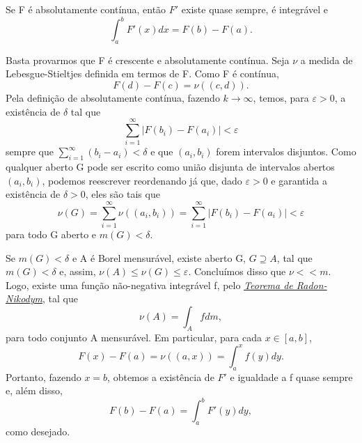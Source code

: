 \documentclass[measure_theory.tex]{subfiles}
\begin{document}
\begin{theorem*}
	Se F é absolutamente contínua, então \(F'\) existe quase sempre, é integrável e
	\[
		\int_{a}^{b}F'(x)dx = F(b) - F(a).
	\]
\end{theorem*}
\begin{proof*}
	Basta provarmos que F é crescente e absolutamente contínua. Seja \(\nu \) a medida de Lebesgue-Stieltjes definida em termos de F. Como F é contínua,
	\[
		F(d) - F(c) = \nu ((c, d)).
	\]
	Pela definição de absolutamente contínua, fazendo \(k\to \infty\), temos, para \(\varepsilon > 0\), a existência de \(\delta \) tal que
	\[
		\sum\limits_{i=1}^{\infty}|F(b_{i}) - F(a_{i})| < \varepsilon
	\]
	sempre que \(\sum\limits_{i=1}^{\infty}(b_{i}-a_{i})<\delta \) e que \((a_{i}, b_{i})\) forem intervalos disjuntos. Como qualquer aberto G pode ser escrito como união disjunta de intervalos abertos \((a_{i}, b_{i})\), podemos reescrever reordenando já que,
	dado \(\varepsilon > 0\) e garantida a existência de \(\delta > 0\), eles são tais que
	\[
		\nu (G) = \sum\limits_{i=1}^{\infty}\nu ((a_{i}, b_{i})) = \sum\limits_{i=1}^{\infty}|F(b_{i}) - F(a_{i})| < \varepsilon
	\]
	para todo G aberto e \(m(G) < \delta .\)

	Se \(m(G) < \delta \) e A é Borel mensurável, existe aberto G, \(G\supseteq A\), tal que \(m(G) < \delta \) e, assim, \(\nu (A) \leq \nu (G) \leq \varepsilon .\) Concluímos disso que \(\nu << m.\)
	Logo, existe uma função não-negativa integrável f, pelo \hyperlink{radon_nikodym}{\textit{Teorema de Radon-Nikodym}}, tal que
	\[
		\nu (A) = \int_{A}f dm,
	\]
	para todo conjunto A mensurável. Em particular, para cada \(x\in [a, b]\),
	\[
		F(x) - F(a) = \nu ((a, x)) = \int_{a}^{x}f(y)dy.
	\]
	Portanto, fazendo \(x=b\), obtemos a existência de \(F'\) e igualdade a f quase sempre e, além disso,
	\[
		F(b) - F(a) = \int_{a}^{b}F'(y)dy,
	\]
	como desejado. \qedsymbol
\end{proof*}
\end{document}

